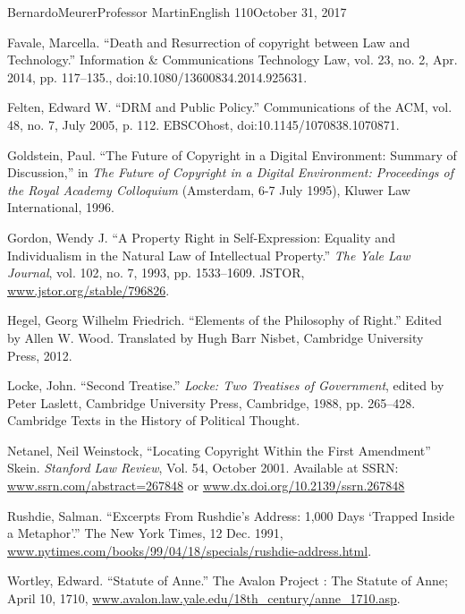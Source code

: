 \documentclass[12pt,letterpaper]{article}
\begin{document}
\begin{mla}{Bernardo}{Meurer}{Professor Martin}{English 110}{October 31, 2017}
    \begin{workscited}
        \bibent
        Favale, Marcella. ``Death and Resurrection of copyright between Law and Technology.'' Information \& Communications Technology Law, vol. 23, no. 2, Apr. 2014, pp. 117–135., doi:10.1080/13600834.2014.925631.

        \bibent
        Felten, Edward W. ``DRM and Public Policy.'' Communications of the ACM, vol. 48, no. 7, July 2005, p. 112. EBSCOhost, doi:10.1145/1070838.1070871.

        \bibent
        \bibent
        Goldstein, Paul. ``The Future of Copyright in a Digital Environment: Summary of Discussion,'' in \textit{The Future of Copyright in a Digital Environment: Proceedings of the Royal Academy Colloquium} (Amsterdam, 6-7 July 1995), Kluwer Law International, 1996.

        \bibent
        Gordon, Wendy J. ``A Property Right in Self-Expression: Equality and Individualism in the Natural Law of Intellectual Property.'' \textit{The Yale Law Journal}, vol. 102, no. 7, 1993, pp. 1533–1609. JSTOR, \url{www.jstor.org/stable/796826}.

        \bibent
        Hegel, Georg Wilhelm Friedrich. ``Elements of the Philosophy of Right.'' Edited by Allen W. Wood. Translated by Hugh Barr Nisbet, Cambridge University Press, 2012.

        \bibent 
        Locke, John. ``Second Treatise.'' \textit{Locke: Two Treatises of Government}, edited by Peter Laslett, Cambridge University Press, Cambridge, 1988, pp. 265–428. Cambridge Texts in the History of Political Thought.

        \bibent
        Netanel, Neil Weinstock, ``Locating Copyright Within the First Amendment'' Skein. \textit{Stanford Law Review}, Vol. 54, October 2001. Available at SSRN: \url{www.ssrn.com/abstract=267848} or \url{www.dx.doi.org/10.2139/ssrn.267848}

        \bibent
        Rushdie, Salman. ``Excerpts From Rushdie's Address: 1,000 Days `Trapped Inside a Metaphor'.'' The New York Times, 12 Dec. 1991, \url{www.nytimes.com/books/99/04/18/specials/rushdie-address.html}. 

        \bibent
        Wortley, Edward. ``Statute of Anne.'' The Avalon Project : The Statute of Anne; April 10, 1710, \url{www.avalon.law.yale.edu/18th_century/anne_1710.asp}.
    \end{workscited}
\end{mla}
\end{document}
